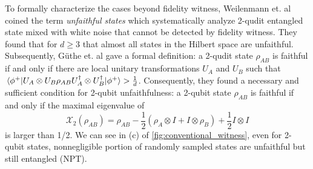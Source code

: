 \documentclass[
aps,
pra,
twocolumn,
floatfix,
]{revtex4-2}
\theoremstyle{plain}
\theoremstyle{definition}
\newtheorem{definition}{Definition}
\newcommand{\dm}{\rho}
\newcommand{\U}{U}
\begin{document}
To formally characterize the cases beyond fidelity witness, Weilenmann et. al \cite{weilenmannEntanglementDetectionMeasuring2020} \cite{huOptimizedDetectionHighDimensional2021} coined the term \emph{unfaithful states} 
which systematically analyze 2-qudit entangled state mixed with white noise that cannot be detected by fidelity witness.
They found that for $d \ge 3$ that almost all states in the Hilbert space are unfaithful. 
Subsequently, G\"{u}the et. al \cite{guhneGeometryFaithfulEntanglement2021} \cite{riccardiExploringRelationshipFaithfulness2021} gave a formal definition: 
	a 2-qudit state $\dm_{AB}$ is faithful if and only if there are local unitary transformations $\U_A$ and $\U_B$ such that
	$\expval{\U_A\otimes\U_B \dm_{AB} \U_A^\dagger \otimes\U_B^\dagger}{\phi^+}> \frac{1}{d}$.
Consequently, they found a necessary and sufficient condition for 2-qubit unfaithfulness: 
a 2-qubit state $\dm_{AB}$ is faithful if and only if the maximal eigenvalue of
\begin{equation}
	\mathcal{X}_2( \dm_{AB})=\rho_{AB}-\frac{1}{2}(\dm_{A}\otimes I + I \otimes \dm_{B})+\frac{1}{2} I \otimes I
	\label{eq:unfaithful_2qubit}
\end{equation}
is larger than 1/2.
We can see in (c) of \cref{fig:conventional_witness}, even for 2-qubit states, nonnegligible portion of randomly sampled states are unfaithful but still entangled (NPT).
\end{document}

